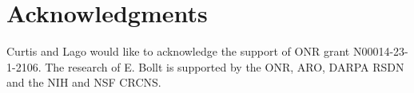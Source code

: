 \documentclass[a4paper,11pt]{article}
\begin{document}
\section*{Acknowledgments}
Curtis and Lago would like to acknowledge the support of ONR grant N00014-23-1-2106.  The research of E. Bollt is supported by the ONR, ARO, DARPA RSDN and the NIH and NSF CRCNS.



\end{document}
